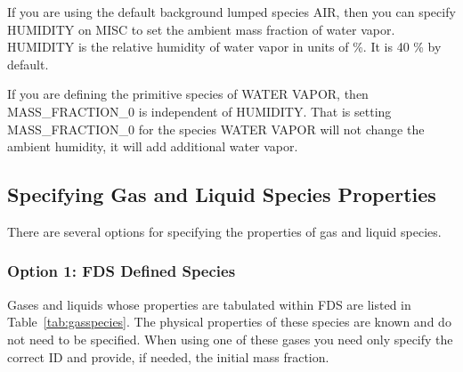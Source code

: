 \documentclass[11pt]{book}
\begin{document}
If you are using the default background lumped species {\ct AIR}, then you can specify {\ct HUMIDITY} on {\ct MISC} to set the ambient mass fraction of water vapor. {\ct HUMIDITY} is the relative humidity of water vapor in units of \%. It is 40 \% by default.

If you are defining the primitive species of {\ct WATER VAPOR}, then {\ct MASS\_FRACTION\_0} is independent of {\ct HUMIDITY}.  That is setting {\ct MASS\_FRACTION\_0} for the species {\ct WATER VAPOR} will not change the ambient humidity, it will add additional water vapor.

\subsection{Specifying Gas and Liquid Species Properties}

\label{gas_species_props}

There are several options for specifying the properties of gas and liquid species.

\subsubsection{Option 1: FDS Defined Species}

Gases and liquids whose properties are tabulated within FDS are listed in Table~\ref{tab:gasspecies}. The physical properties of these species are known and do not need to be specified. When using one of these gases you need only specify the correct {\ct ID} and provide, if needed, the initial mass fraction.
\end{document}
